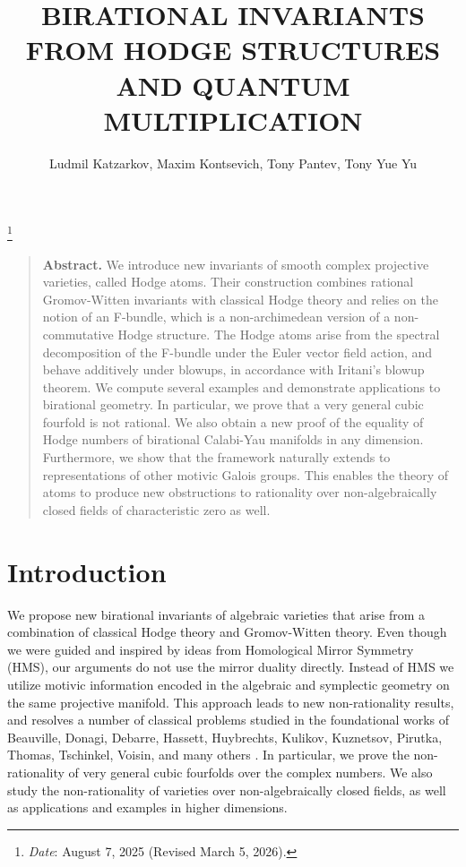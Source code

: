 \documentclass[twoside,leqno]{article}
\title{\large\bfseries \uppercase{Birational Invariants from Hodge Structures  \\ 
and Quantum Multiplication}}
\author{Ludmil Katzarkov, Maxim Kontsevich, Tony Pantev, Tony Yue Yu}
\date{}
\newcommand\blfootnote[1]{%
	\begingroup
	\renewcommand\thefootnote{}\footnote{#1}%
	\addtocounter{footnote}{-1}%
	\endgroup
}
\numberwithin{equation}{section}
\theoremstyle{plain}
\theoremstyle{definition}
\begin{document}
\maketitle

\blfootnote{\emph{Date}: August 7, 2025 (Revised March 5, 2026).}





\begin{quotation}
\small
\textbf{Abstract. }
We introduce new invariants of smooth complex projective varieties, called Hodge atoms. Their construction combines rational Gromov-Witten invariants with classical Hodge theory and relies on the notion of an F-bundle, which is a non-archimedean version of a non-commutative Hodge structure. The Hodge atoms arise from the spectral decomposition of the F-bundle under the Euler vector field action, and behave additively under blowups, in accordance with Iritani's blowup theorem. We compute several examples and demonstrate applications to birational geometry. In particular, we prove that a very general cubic fourfold is not rational. 
We also obtain a new proof of the equality of Hodge numbers of birational Calabi-Yau manifolds in any dimension.
Furthermore, we show that the framework naturally extends to representations of other motivic Galois groups. This enables the theory of atoms to produce new obstructions to rationality over non-algebraically closed fields of characteristic zero as well.
\end{quotation}

\tableofcontents

\section{Introduction}

We propose new birational invariants of algebraic
varieties that arise from a combination of classical Hodge theory and
Gromov-Witten theory. Even though we were guided and inspired by ideas
from Homological Mirror Symmetry (HMS), our arguments do not use the
mirror duality directly. Instead of HMS we utilize motivic information
encoded in the algebraic and symplectic geometry on the same
projective manifold.  This approach leads to new non-rationality
results, and resolves a number of classical problems studied in the
foundational works of Beauville, Donagi, Debarre, Hassett, Huybrechts, Kulikov,
Kuznetsov, Pirutka, Thomas, Tschinkel, Voisin, and many others
\cite{Beauville-quadrics,Beauville-Donagi,DK-GM,DK-GMIJ,debarre-GM,
Hassett-cubic4fold,Hassett-survey,HPT-qb,HPT-ds,HPT-threeq,
Huybrechts-survey,Hyubrechts-K3cubic,
kulikov-cubic4fold,Kuznetsov-cubic4fold,Kuznetsov-derived,KP-Mukai,
KP-Fano3nc,Pirutka-0cycles,ABP-qb,AT,
Voisin-unirational,Voisin-decomposition,Voisin-stable,Voisin-integral}.
In particular, we prove the non-rationality of very general
cubic fourfolds over the complex numbers.
We also study the non-rationality of varieties over non-algebraically closed fields, as well as applications and examples in higher dimensions.
\end{document}
